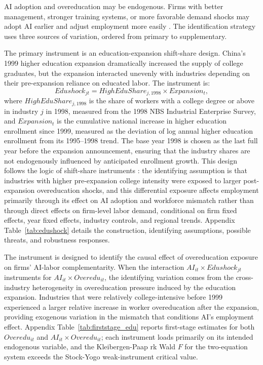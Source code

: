 \documentclass[12pt,a4paper]{article}
\theoremstyle{predstyle}
\theoremstyle{plain}
\newcommand{\Overedu}{\mathit{Overedu}}
\begin{document}
AI adoption and overeducation may be endogenous. Firms with better management, stronger training systems, or more favorable demand shocks may adopt AI earlier and adjust employment more easily \citep{angrist2009mostly}. The identification strategy uses three sources of variation, ordered from primary to supplementary.

The primary instrument is an education-expansion shift-share design. China's 1999 higher education expansion dramatically increased the supply of college graduates, but the expansion interacted unevenly with industries depending on their pre-expansion reliance on educated labor. The instrument is:
\begin{equation}
Edushock_{jt}
= HighEduShare_{j,1998}\times Expansion_t,
\label{eq:edushock}
\end{equation}
where \(HighEduShare_{j,1998}\) is the share of workers with a college degree or above in industry \(j\) in 1998, measured from the 1998 NBS Industrial Enterprise Survey, and \(Expansion_t\) is the cumulative national increase in higher education enrollment since 1999, measured as the deviation of log annual higher education enrollment from its 1995--1998 trend. The base year 1998 is chosen as the last full year before the expansion announcement, ensuring that the industry shares are not endogenously influenced by anticipated enrollment growth. This design follows the logic of shift-share instruments \citep{goldsmith2020bartik, borusyak2022quasi}: the identifying assumption is that industries with higher pre-expansion college intensity were exposed to larger post-expansion overeducation shocks, and this differential exposure affects employment primarily through its effect on AI adoption and workforce mismatch rather than through direct effects on firm-level labor demand, conditional on firm fixed effects, year fixed effects, industry controls, and regional trends. Appendix Table~\ref{tab:edushock} details the construction, identifying assumptions, possible threats, and robustness responses.

The instrument is designed to identify the causal effect of overeducation exposure on firms' AI-labor complementarity. When the interaction \(AI_{it} \times Edushock_{jt}\) instruments for \(AI_{it} \times \Overedu_{it}\), the identifying variation comes from the cross-industry heterogeneity in overeducation pressure induced by the education expansion. Industries that were relatively college-intensive before 1999 experienced a larger relative increase in worker overeducation after the expansion, providing exogenous variation in the mismatch that conditions AI's employment effect. Appendix Table~\ref{tab:firststage_edu} reports first-stage estimates for both \(\Overedu_{it}\) and \(AI_{it} \times \Overedu_{it}\); each instrument loads primarily on its intended endogenous variable, and the Kleibergen-Paap rk Wald \(F\) for the two-equation system exceeds the Stock-Yogo weak-instrument critical value.
\end{document}
